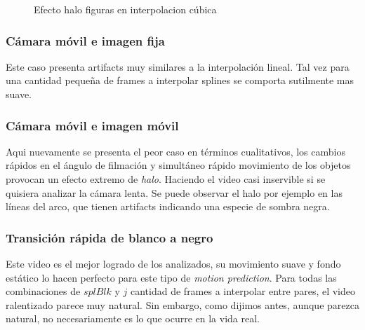 \begin{figure}[H]
    \centering
    \caption{Efecto halo figuras en interpolacion cúbica}
    \label{fig:artifact}
\end{figure}

\subsubsection{Cámara móvil e imagen fija}
Este caso presenta artifacts muy similares a la interpolación lineal. Tal vez para una cantidad pequeña de frames a interpolar splines se comporta sutilmente mas suave.

\subsubsection{Cámara móvil e imagen móvil}
Aqui nuevamente se presenta el peor caso en términos cualitativos, los cambios rápidos en el ángulo de filmación y simultáneo rápido movimiento de los objetos provocan un efecto extremo de \emph{halo}. Haciendo el video casi inservible si se quisiera analizar la cámara lenta. Se puede observar el halo por ejemplo en las líneas del arco, que tienen artifacts indicando una especie de sombra negra. 

\subsubsection{Transición rápida de blanco a negro}
Este video es el mejor logrado de los analizados, su movimiento suave y fondo estático lo hacen perfecto para este tipo de \emph{motion prediction}. Para todas las combinaciones de $splBlk$ y $j$ cantidad de frames a interpolar entre pares, el video ralentizado parece muy natural. Sin embargo, como dijimos antes, aunque parezca natural, no necesariamente es lo que ocurre en la vida real.

